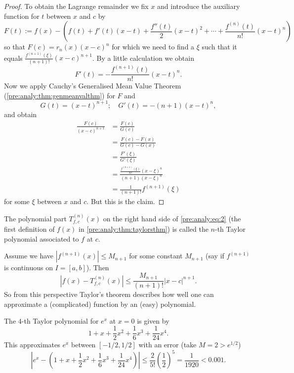 \documentclass[10pt, a4paper]{article}
\begin{document}
\begin{theorem}
\begin{proof}
        To obtain the Lagrange remainder we fix $x$ and introduce the auxiliary function for $t$ between $x$ and $c$ by
        \[
        F(t) := f(x) - \left(f(t) + f'(t)(x - t) + \frac{f''(t)}{2}(x - t) ^ 2 + \dotsi + \frac{f ^ {(n)}(t)}{n!}(x - t) ^ n\right)
        \]
        so that $F(c) = r_n(x)(x - c) ^ n$ for which we need to find a $\xi$ such that it equals $\frac{f ^ {(n + 1)}(\xi)}{(n + 1)!}(x - c) ^ {n + 1}$.
        By a little calculation we obtain
        \[
        F'(t) = -\frac{f ^ {(n + 1)}(t)}{n!}(x - t) ^ {n}.
        \]
        Now we apply Cauchy's Generalised Mean Value Theorem
        (\autoref{pre:analy:thm:genmeanvalthm})
        for $F$ and
        \[
        G(t) = (x - t) ^ {n + 1};\quad G'(t) = -(n + 1)(x - t) ^ n,
        \]
        and obtain
        \begin{align*}
            \frac{F(c)}{(x - c) ^ {n + 1}} &= \frac{F(c)}{G(c)} \\
            &= \frac{F(c) - F(x)}{G(c) - G(x)} \\
            &= \frac{F'(\xi)}{G'(\xi)} \\
            &= \frac{\frac{f ^ {(n + 1)}(\xi)}{n!}(x - \xi) ^ n}{(n + 1)(x - \xi) ^ n} \\
            &= \frac{1}{(n + 1)!}f ^ {(n + 1)}(\xi)
        \end{align*}
        for some $\xi$ between $x$ and $c$.
        But this is the claim.
    \end{proof}
\end{theorem}

\begin{corollary}\label{pre:analy:cor:polypartoftaylor}
    The polynomial part $T_{f, c}^{(n)}(x)$ on the right hand side of \eqref{pre:analy:eq:2}
    (the first definition of $f(x)$ in \autoref{pre:analy:thm:taylorsthm}) 
    is called the $n$-th Taylor polynomial associated to $f$ at $c$.
\end{corollary}

Assume we have $|f ^ {(n + 1)}(x)| \leq M_{n + 1}$ for some constant $M_{n + 1}$
(say if $f ^ {(n + 1)}$ is continuous on $I = [a, b]$).
Then
\[
|f(x) - T_{f, c}^{(n)}(x)| \leq \frac{M_{n + 1}}{(n + 1)!}|x - c| ^ {n + 1}.
\]
So from this perspective Taylor's theorem describes how well one can approximate a
(complicated)
function by an
(easy)
polynomial.

\begin{example}
    The $4$-th Taylor polynomial for $e ^ x$ at $x = 0$ is given by
    \[
    1 + x + \frac{1}{2}x ^ 2 + \frac{1}{6}x ^ 3 + \frac{1}{24}x ^ 4.
    \]
    This approximates $e ^ x$ between $[-1 / 2, 1 / 2]$ with an error
    (take $M = 2 > e ^ {1 / 2}$)
    \[
    \left|e ^ {x} - \left(1 + x + \frac{1}{2}x ^ 2 + \frac{1}{6}x ^ 3 + \frac{1}{24}x ^ 4\right)\right| \leq \frac{2}{5!}\left(\frac{1}{2}\right) ^ 5 = \frac{1}{1920} < 0.001.
    \]
\end{example}
\end{document}
